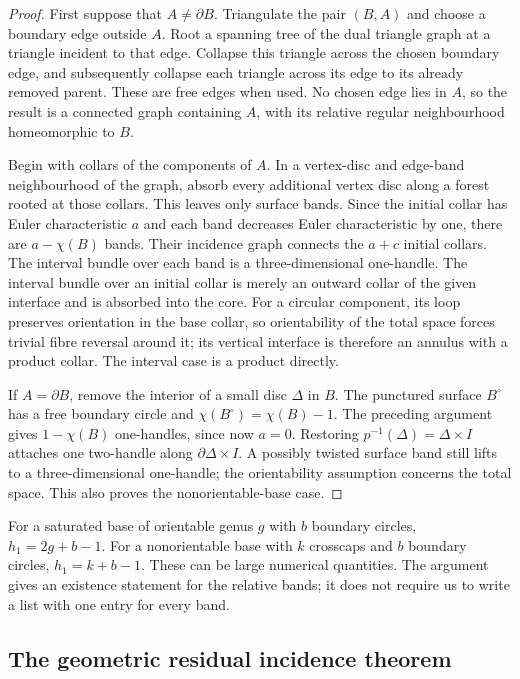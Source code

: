 \begin{proof}
First suppose that $A\ne\partial B$.  Triangulate the pair $(B,A)$ and
choose a boundary edge outside $A$.  Root a spanning tree of the dual
triangle graph at a triangle incident to that edge.  Collapse this
triangle across the chosen boundary edge, and subsequently collapse
each triangle across its edge to its already removed parent.  These
are free edges when used.  No chosen edge lies in $A$, so the result
is a connected graph containing $A$, with its relative regular
neighbourhood homeomorphic to $B$.

Begin with collars of the components of $A$.  In a vertex-disc and
edge-band neighbourhood of the graph, absorb every additional vertex
disc along a forest rooted at those collars.  This leaves only surface
bands.  Since the initial collar has Euler characteristic $a$ and each
band decreases Euler characteristic by one, there are $a-\chi(B)$
bands.  Their incidence graph connects the $a+c$ initial collars.
The interval bundle over each band is a three-dimensional one-handle.
The interval bundle over an initial collar is merely an outward collar
of the given interface and is absorbed into the core.  For a circular
component, its loop preserves orientation in the base collar, so
orientability of the total space forces trivial fibre reversal around
it; its vertical interface is therefore an annulus with a product
collar.  The interval case is a product directly.

If $A=\partial B$, remove the interior of a small disc $\Delta$ in $B$.
The punctured surface $B^\circ$ has a free boundary circle and
$\chi(B^\circ)=\chi(B)-1$.  The preceding argument gives
$1-\chi(B)$ one-handles, since now $a=0$.  Restoring
$p^{-1}(\Delta)=\Delta\times I$ attaches one two-handle along
$\partial\Delta\times I$.  A possibly twisted surface band still
lifts to a three-dimensional one-handle; the orientability assumption
concerns the total space.  This also proves the nonorientable-base case.
\end{proof}

For a saturated base of orientable genus $g$ with $b$ boundary circles,
$h_1=2g+b-1$.  For a nonorientable base with $k$ crosscaps and $b$
boundary circles, $h_1=k+b-1$.  These can be large numerical quantities.
The argument gives an existence statement for the relative bands; it
does not require us to write a list with one entry for every band.

\subsection{The geometric residual incidence theorem}
\label{geom:residual}

